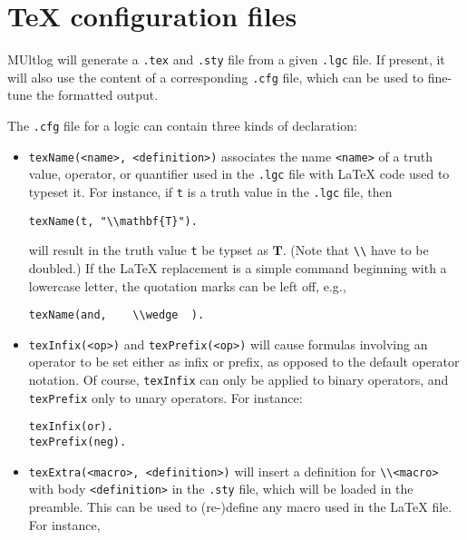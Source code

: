 \documentclass[]{article}
\newcommand{\passthrough}[1]{#1}
\begin{document}
\hypertarget{tex-configuration-files}{%
\section{TeX configuration files}\label{tex-configuration-files}}

MUltlog will generate a \passthrough{\lstinline!.tex!} and
\passthrough{\lstinline!.sty!} file from a given
\passthrough{\lstinline!.lgc!} file. If present, it will also use the
content of a corresponding \passthrough{\lstinline!.cfg!} file, which
can be used to fine-tune the formatted output.

The \passthrough{\lstinline!.cfg!} file for a logic can contain three
kinds of declaration:

\begin{itemize}
\item
  \passthrough{\lstinline!texName(<name>, <definition>)!} associates the
  name \passthrough{\lstinline!<name>!} of a truth value, operator, or
  quantifier used in the \passthrough{\lstinline!.lgc!} file with LaTeX
  code used to typeset it. For instance, if \passthrough{\lstinline!t!}
  is a truth value in the \passthrough{\lstinline!.lgc!} file, then

\begin{lstlisting}
texName(t, "\\mathbf{T}").
\end{lstlisting}

  will result in the truth value \passthrough{\lstinline!t!} be typset
  as \(\mathbf{T}\). (Note that \passthrough{\lstinline!\\!} have to be
  doubled.) If the LaTeX replacement is a simple command beginning with
  a lowercase letter, the quotation marks can be left off, e.g.,

\begin{lstlisting}
texName(and,    \\wedge  ).
\end{lstlisting}
\item
  \passthrough{\lstinline!texInfix(<op>)!} and
  \passthrough{\lstinline!texPrefix(<op>)!} will cause formulas
  involving an operator to be set either as infix or prefix, as opposed
  to the default operator notation. Of course,
  \passthrough{\lstinline!texInfix!} can only be applied to binary
  operators, and \passthrough{\lstinline!texPrefix!} only to unary
  operators. For instance:

\begin{lstlisting}
texInfix(or).
texPrefix(neg).
\end{lstlisting}
\item
  \passthrough{\lstinline!texExtra(<macro>, <definition>)!} will insert
  a definition for \passthrough{\lstinline!\\<macro>!} with body
  \passthrough{\lstinline!<definition>!} in the
  \passthrough{\lstinline!.sty!} file, which will be loaded in the
  preamble. This can be used to (re-)define any macro used in the LaTeX
  file. For instance,


\end{itemize}
\end{document}

